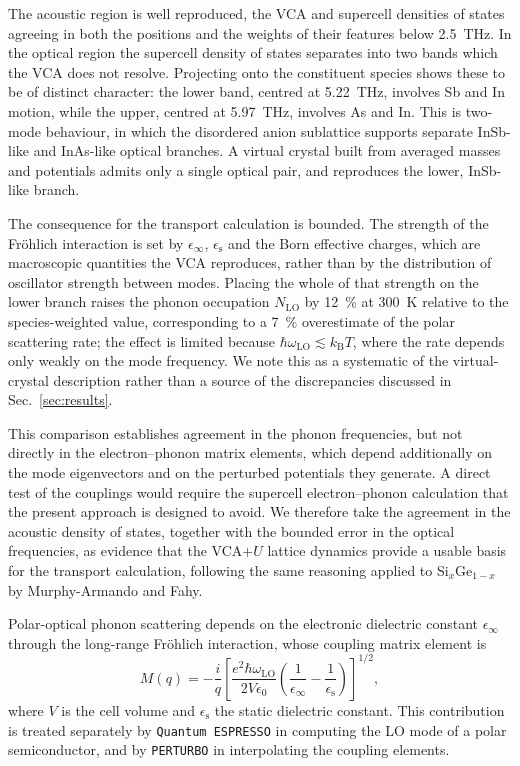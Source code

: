\documentclass[aps,prmaterials,reprint,amsmath,amssymb,superscriptaddress]{revtex4-2}
\begin{document}
The acoustic region is well reproduced, the VCA and supercell densities of states agreeing in both the positions and the weights of their features below \SI{2.5}{\tera\hertz}. In the optical region the supercell density of states separates into two bands which the VCA does not resolve. Projecting onto the constituent species shows these to be of distinct character: the lower band, centred at \SI{5.22}{\tera\hertz}, involves Sb and In motion, while the upper, centred at \SI{5.97}{\tera\hertz}, involves As and In. This is two-mode behaviour, in which the disordered anion sublattice supports separate InSb-like and InAs-like optical branches. A virtual crystal built from averaged masses and potentials admits only a single optical pair, and reproduces the lower, InSb-like branch.

The consequence for the transport calculation is bounded. The strength of the Fr{\"o}hlich interaction is set by $\epsilon_\infty$, $\epsilon_\text{s}$ and the Born effective charges, which are macroscopic quantities the VCA reproduces, rather than by the distribution of oscillator strength between modes. Placing the whole of that strength on the lower branch raises the phonon occupation $N_\text{LO}$ by \SI{12}{\percent} at \SI{300}{\kelvin} relative to the species-weighted value, corresponding to a \SI{7}{\percent} overestimate of the polar scattering rate; the effect is limited because $\hbar\omega_\text{LO}\lesssim k_\text{B}T$, where the rate depends only weakly on the mode frequency. We note this as a systematic of the virtual-crystal description rather than a source of the discrepancies discussed in Sec.~\ref{sec:results}.

This comparison establishes agreement in the phonon frequencies, but not directly in the electron--phonon matrix elements, which depend additionally on the mode eigenvectors and on the perturbed potentials they generate. A direct test of the couplings would require the supercell electron--phonon calculation that the present approach is designed to avoid. We therefore take the agreement in the acoustic density of states, together with the bounded error in the optical frequencies, as evidence that the VCA$+U$ lattice dynamics provide a usable basis for the transport calculation, following the same reasoning applied to Si$_x$Ge$_{1-x}$ by Murphy-Armando and Fahy\cite{MurphyArmando2008}.

Polar-optical phonon scattering depends on the electronic dielectric constant $\epsilon_\infty$ through the long-range Fr{\"o}hlich interaction\cite{Froehlich1954,Verdi2015,Sjakste2015}, whose coupling matrix element is 
\begin{equation}
    M(q) = -\frac{i}{q} \left[ \frac{e^2 \hbar \omega_{\mathrm{LO}}}
    {2V\epsilon_0} \left( \frac{1}{\epsilon_\infty} - \frac{1}{\epsilon_\text{s}} \right)
    \right]^{1/2},
    \label{eq:frohlich}
\end{equation}
where $V$ is the cell volume and $\epsilon_\text{s}$ the static dielectric constant. This contribution is treated separately by \texttt{Quantum ESPRESSO} in computing the LO mode of a polar semiconductor, and by \texttt{PERTURBO} in interpolating the coupling elements.
\end{document}
